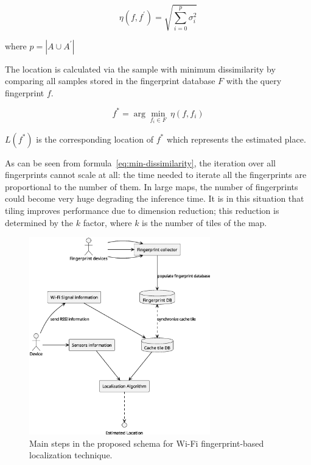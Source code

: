 \begin{equation}
	\eta(f, f^{'}) = \sqrt{\sum_{i=0}^{p} \sigma_i^{2}}
	\label{eq:dissimilarity}
\end{equation}

where $p = | A \cup A^{'} |$

The location is calculated via the sample with minimum dissimilarity by comparing all samples stored in the fingerprint database $F$ with the query
fingerprint $f$.

\begin{equation}
	f^{*} = \arg \min_{f_i \in F} \ \eta(f, f_i)
	\label{eq:min-dissimilarity}
\end{equation}

$L(f^{*})$ is the corresponding location of $f^{*}$ which represents the estimated place.

As can be seen from formula~\ref{eq:min-dissimilarity}, the iteration over all fingerprints cannot scale at all: the time needed to iterate all the
fingerprints are proportional to the number of them. In large maps, the number of fingerprints could become very huge degrading the inference time.
It is in this situation that tiling improves performance due to dimension reduction; this reduction is determined by the $k$ factor, where $k$ is the
number of tiles of the map.

\begin{figure}[H]
	\centering
	\includegraphics[width=0.7\textwidth]{img/fingerprint-schema.eps}
	\caption{Main steps in the proposed schema for Wi-Fi fingerprint-based localization technique.}
	\label{fig:fingerprint-schema}
\end{figure}

